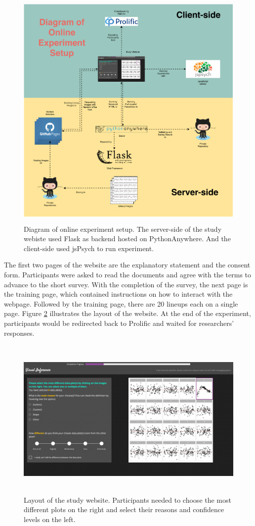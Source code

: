 \documentclass{monashthesis}
\theoremstyle{definition}
\theoremstyle{definition}
\theoremstyle{definition}
\theoremstyle{definition}
\theoremstyle{remark}
\begin{document}
\begin{figure}
\centering
\includegraphics[width=4.6875in,height=4.6875in]{figures/experiment_tech.pdf}
\caption{Diagram of online experiment setup. The server-side of the study webiste used Flask as backend hosted on PythonAnywhere. And the client-side used jsPsych to run experiment. \label{fig:diagram-experiment}}
\end{figure}

The first two pages of the website are the explanatory statement and the consent form. Participants were asked to read the documents and agree with the terms to advance to the short survey. With the completion of the survey, the next page is the training page, which contained instructions on how to interact with the webpage. Followed by the training page, there are 20 lineups each on a single page. Figure \ref{fig:website-layout} illustrates the layout of the website. At the end of the experiment, participants would be redirected back to Prolific and waited for researchers' responses.

\begin{figure}
\centering
\includegraphics[width=5.72917in,height=3.11458in]{figures/website.png}
\caption{Layout of the study website. Participants needed to choose the most different plots on the right and select their reasons and confidence levels on the left. \label{fig:website-layout}}
\end{figure}
\end{document}
